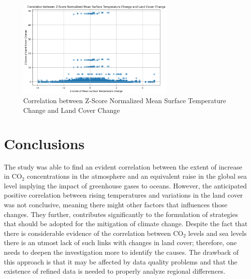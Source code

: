 \documentclass[a4paper,11pt]{article}
\begin{document}
\begin{figure}[ht!]
    \centering
    \includegraphics[width=0.7\textwidth]{pictures/q2.png}
    \caption{Correlation between Z-Score Normalized Mean Surface Temperature Change and Land Cover Change}
    \label{fig:temp_vs_land_cover}
\end{figure}

\section*{Conclusions}

The study was able to find an evident correlation between the extent of increase in \(\text{CO}_2\) concentrations in the atmosphere and an equivalent raise in the global sea level implying the impact of greenhouse gases to oceans. However, the anticipated positive correlation between rising temperatures and variations in the land cover was not conclusive, meaning there might other factors that influences those changes. They further, contributes significantly to the formulation of strategies that should be adopted for the mitigation of climate change. Despite the fact that there is considerable evidence of the correlation between \(\text{CO}_2\) levels and sea levels there is an utmost lack of such links with changes in land cover; therefore, one needs to deepen the investigation more to identify the causes. The drawback of this approach is that it may be affected by data quality problems and that the existence of refined data is needed to properly analyze regional differences.



\end{document}
